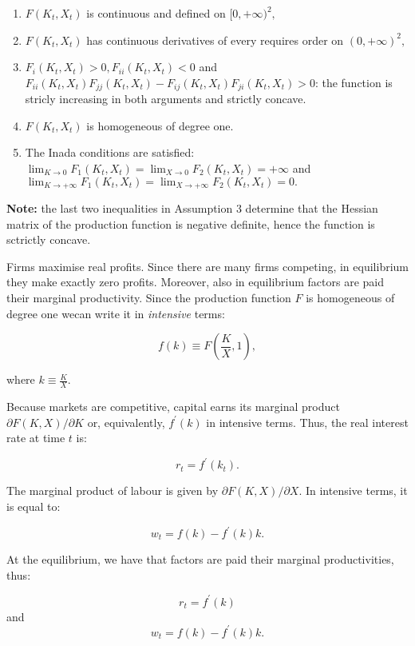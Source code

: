 \documentclass[11pt,a4paper,english]{article}
\providecommand{\tightlist}{%
  \setlength{\itemsep}{0pt}\setlength{\parskip}{0pt}}
\begin{document}
\begin{enumerate}
\def\labelenumi{\arabic{enumi}.}
\tightlist
\item
  \(F(K_{t}, X_{t})\) is continuous and defined on \([0,+\infty)^{2},\)
\item
  \(F(K_{t}, X_{t})\) has continuous derivatives of every requires order
  on \((0,+\infty)^2,\)
\item
  \(F_{i}(K_{t}, X_{t}) > 0, F_{ii}(K_{t}, X_{t}) < 0\) and
  \(F_{ii}(K_{t},X_{t}) F_{jj}(K_{t}, X_{t}) - F_{ij}(K_{t}, X_{t})F_{ji}(K_{t}, X_{t})>0\):
  the function is stricly increasing in both arguments and strictly
  concave.
\item
  \(F(K_{t}, X_{t})\) is homogeneous of degree one.
\item
  The Inada conditions are satisfied:
  \(\lim_{K \rightarrow 0} F_{1}(K_{t}, X_{t}) = \lim_{X \rightarrow 0} F_{2}(K_{t}, X_{t}) = +\infty\)
  and
  \(\lim_{K \rightarrow +\infty} F_{1}(K_{t}, X_{t}) = \lim_{X \rightarrow +\infty} F_{2}(K_{t}, X_{t}) = 0.\)
\end{enumerate}

\textbf{Note:} the last two inequalities in Assumption 3 determine that
the Hessian matrix of the production function is negative definite,
hence the function is sctrictly concave.

Firms maximise real profits. Since there are many firms competing, in
equilibrium they make exactly zero profits. Moreover, also in
equilibrium factors are paid their marginal productivity. Since the
production function \(F\) is homogeneous of degree one wecan write it in
\emph{intensive} terms:

\[f(k) \equiv F\left(\frac{K}{X},1\right),\]

where \(k \equiv \frac{K}{X}\).

Because markets are competitive, capital earns its marginal product
\(\partial F(K,X)/ \partial K\) or, equivalently, \(f^{\prime}(k)\) in
intensive terms. Thus, the real interest rate at time \(t\) is:

\[r_{t} = f^{\prime}(k_{t}).\]

The marginal product of labour is given by
\(\partial F(K,X)/\partial X.\) In intensive terms, it is equal to:

\[w_{t} = f(k) - f^{\prime}(k) k.\]

At the equilibrium, we have that factors are paid their marginal
productivities, thus:

\[r_{t} = f^{\prime}(k)\] and \[w_{t} = f(k) - f^{\prime}(k)k.\]
\end{document}
